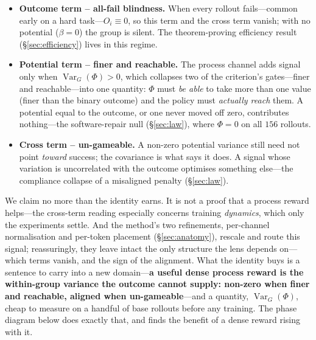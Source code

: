 \begin{itemize}[leftmargin=1.4em,itemsep=2pt,topsep=2pt]
\item \textbf{Outcome term -- all-fail blindness.} When every rollout fails---common early on
a hard task---$O_i\equiv 0$, so this term and the cross term vanish; with no potential
($\beta=0$) the group is silent. The theorem-proving efficiency result (\S\ref{sec:efficiency})
lives in this regime.
\item \textbf{Potential term -- finer and reachable.} The process channel adds signal only
when $\operatorname{Var}_G(\Phi)>0$, which collapses two of the criterion's gates---finer and
reachable---into one quantity: $\Phi$ must \emph{be able} to take more than one value (finer
than the binary outcome) and the policy must \emph{actually reach} them. A potential equal to
the outcome, or one never moved off zero, contributes nothing---the software-repair null
(\S\ref{sec:law}), where $\Phi=0$ on all $156$ rollouts.
\item \textbf{Cross term -- un-gameable.} A non-zero potential variance still need not point
\emph{toward} success; the covariance is what says it does. A signal whose variation is
uncorrelated with the outcome optimises something else---the compliance collapse of a
misaligned penalty (\S\ref{sec:law}).
\end{itemize}

We claim no more than the identity earns. It is not a proof that a process reward helps---the
cross-term reading especially concerns training \emph{dynamics}, which only the experiments
settle. And the method's two refinements, per-channel normalisation and per-token placement
(\S\ref{sec:anatomy}), rescale and route this signal; reassuringly, they leave intact the only
structure the lens depends on---which terms vanish, and the sign of the alignment. What the
identity buys is a sentence to carry into a new domain---\textbf{a useful dense process reward
is the within-group variance the outcome cannot supply: non-zero when finer and reachable,
aligned when un-gameable}---and a quantity, $\operatorname{Var}_G(\Phi)$, cheap to measure on a
handful of base rollouts before any training. The phase diagram below does exactly that, and
finds the benefit of a dense reward rising with it.

